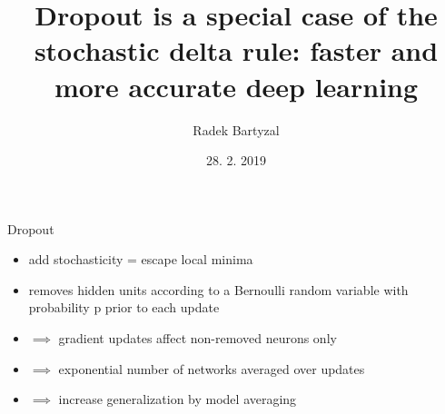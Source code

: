 \documentclass{beamer}
\begin{document}
\title{Dropout is a special case of the stochastic delta rule: faster and more accurate
deep learning}  
\author{Radek Bartyzal}
\date{28. 2. 2019} 

\frame{\titlepage} 

\begin{frame}{Dropout}

\begin{itemize}
\item add stochasticity = escape local minima
\item removes hidden units according to a Bernoulli
random variable with probability p prior to each
update

\item $\implies$ gradient updates affect non-removed neurons only
\item $\implies$ exponential number of networks averaged over updates
\item $\implies$ increase generalization by model averaging
\end{itemize}

\end{frame}
\end{document}
